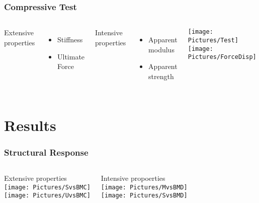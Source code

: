 \documentclass[xcolor=table,11pt]{beamer}
\begin{document}
	\begin{frame}
		\frametitle{Compressive Test}
		\begin{columns}
			Extensive properties
			\begin{itemize}
				\item Stiffness
				\item Ultimate Force
			\end{itemize}

			\vspace{5mm}

			Intensive properties
			\begin{itemize}
				\item Apparent modulus
				\item Apparent strength
			\end{itemize}


			\centering
			\hspace{-10mm}
			\texttt{[image: Pictures/Test]}
			\texttt{[image: Pictures/ForceDisp]}
		\end{columns}
	\end{frame}

	
	\section{Results}

	\begin{frame}
		\frametitle{Structural Response}
		\centering
		\vfill
		\begin{columns}
			\column{0.45\linewidth}
			\centering
			Extensive properties\\
			\vspace{2mm}
			\texttt{[image: Pictures/SvsBMC]}\\
			\texttt{[image: Pictures/UvsBMC]}

			\column{0.45\linewidth}
			\centering
			Intensive propoerties\\
			\vspace{2mm}
			\texttt{[image: Pictures/MvsBMD]}\\
			\texttt{[image: Pictures/SvsBMD]}
		\end{columns}
		\vfill
	\end{frame}
\end{document}
